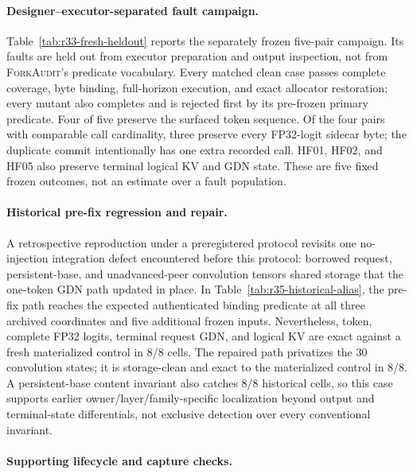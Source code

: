 \documentclass{article}
\newcommand{\method}{\textsc{ForkAudit}}
\begin{document}
\paragraph{Designer--executor-separated fault campaign.}
Table~\ref{tab:r33-fresh-heldout} reports the separately frozen five-pair
campaign.  Its faults are held out from executor preparation and output
inspection, not from \method{}'s predicate vocabulary.  Every matched clean
case passes complete coverage, byte binding,
full-horizon execution, and exact allocator restoration; every mutant also
completes and is rejected first by its pre-frozen primary predicate.  Four of
five preserve the surfaced token sequence.  Of the four pairs with comparable
call cardinality, three preserve every FP32-logit sidecar byte; the duplicate
commit intentionally has one extra recorded call.  HF01, HF02, and HF05 also
preserve terminal logical KV and GDN state.  These are five fixed frozen
outcomes, not an estimate over a fault population.

\paragraph{Historical pre-fix regression and repair.}
A retrospective reproduction under a preregistered protocol revisits one
no-injection integration defect encountered before this protocol: borrowed
request, persistent-base, and unadvanced-peer convolution tensors shared
storage that the one-token GDN path updated in place.  In
Table~\ref{tab:r35-historical-alias}, the pre-fix
path reaches the expected authenticated binding predicate at all three
archived coordinates and five additional frozen inputs.  Nevertheless, token,
complete FP32 logits, terminal request GDN, and logical KV are exact against a
fresh materialized control in 8/8 cells.  The repaired path privatizes the 30
convolution states; it is storage-clean and exact to the materialized control
in 8/8.  A persistent-base content invariant also catches 8/8 historical
cells, so this case supports earlier owner/layer/family-specific localization
beyond output and terminal-state differentials, not exclusive detection over
every conventional invariant.



\paragraph{Supporting lifecycle and capture checks.}
\end{document}
